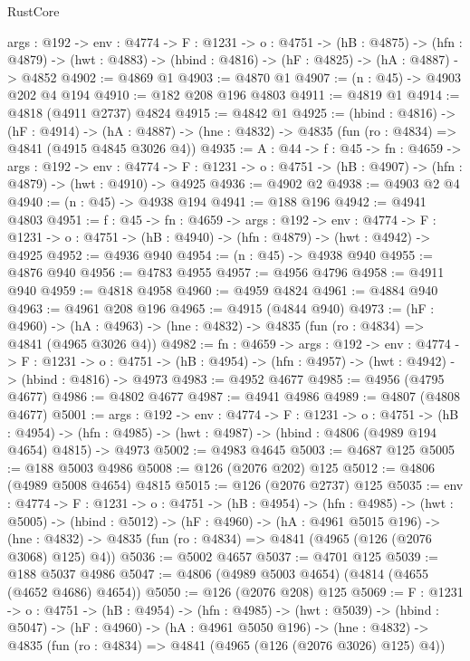 \begin{lexlean}{RustCore}
\begin{coremodule}
  {args : @192} ->
  {env : @4774} ->
  {F : @1231} ->
  {o : @4751} ->
  (hB : @4875) ->
  (hfn : @4879) -> (hwt : @4883) -> (hbind : @4816) -> (hF : @4825) -> (hA : @4887) -> @4852
@4902 := @4869 @1
@4903 := @4870 @1
@4907 := (n : @45) -> @4903 @202 @4 @194
@4910 := @182 @208 @196 @4803
@4911 := @4819 @1
@4914 := @4818 (@4911 @2737) @4824
@4915 := @4842 @1
@4925 := (hbind : @4816) ->
  (hF : @4914) ->
  (hA : @4887) -> (hne : @4832) -> @4835 (fun (ro : @4834) => @4841 (@4915 @4845 @3026 @4))
@4935 := {A : @44} ->
  {f : @45} ->
  {fn : @4659} ->
  {args : @192} ->
  {env : @4774} ->
  {F : @1231} -> {o : @4751} -> (hB : @4907) -> (hfn : @4879) -> (hwt : @4910) -> @4925
@4936 := @4902 @2
@4938 := @4903 @2 @4
@4940 := (n : @45) -> @4938 @194
@4941 := @188 @196
@4942 := @4941 @4803
@4951 := {f : @45} ->
  {fn : @4659} ->
  {args : @192} ->
  {env : @4774} ->
  {F : @1231} -> {o : @4751} -> (hB : @4940) -> (hfn : @4879) -> (hwt : @4942) -> @4925
@4952 := @4936 @940
@4954 := (n : @45) -> @4938 @940
@4955 := @4876 @940
@4956 := @4783 @4955
@4957 := @4956 @4796
@4958 := @4911 @940
@4959 := @4818 @4958
@4960 := @4959 @4824
@4961 := @4884 @940
@4963 := @4961 @208 @196
@4965 := @4915 (@4844 @940)
@4973 := (hF : @4960) ->
  (hA : @4963) -> (hne : @4832) -> @4835 (fun (ro : @4834) => @4841 (@4965 @3026 @4))
@4982 := {fn : @4659} ->
  {args : @192} ->
  {env : @4774} ->
  {F : @1231} ->
  {o : @4751} -> (hB : @4954) -> (hfn : @4957) -> (hwt : @4942) -> (hbind : @4816) -> @4973
@4983 := @4952 @4677
@4985 := @4956 (@4795 @4677)
@4986 := @4802 @4677
@4987 := @4941 @4986
@4989 := @4807 (@4808 @4677)
@5001 := {args : @192} ->
  {env : @4774} ->
  {F : @1231} ->
  {o : @4751} ->
  (hB : @4954) ->
  (hfn : @4985) -> (hwt : @4987) -> (hbind : @4806 (@4989 @194 @4654) @4815) -> @4973
@5002 := @4983 @4645
@5003 := @4687 @125
@5005 := @188 @5003 @4986
@5008 := @126 (@2076 @202) @125
@5012 := @4806 (@4989 @5008 @4654) @4815
@5015 := @126 (@2076 @2737) @125
@5035 := {env : @4774} ->
  {F : @1231} ->
  {o : @4751} ->
  (hB : @4954) ->
  (hfn : @4985) ->
  (hwt : @5005) ->
  (hbind : @5012) ->
  (hF : @4960) ->
  (hA : @4961 @5015 @196) ->
  (hne : @4832) -> @4835 (fun (ro : @4834) => @4841 (@4965 (@126 (@2076 @3068) @125) @4))
@5036 := @5002 @4657
@5037 := @4701 @125
@5039 := @188 @5037 @4986
@5047 := @4806 (@4989 @5003 @4654) (@4814 (@4655 (@4652 @4686) @4654))
@5050 := @126 (@2076 @208) @125
@5069 := {F : @1231} ->
  {o : @4751} ->
  (hB : @4954) ->
  (hfn : @4985) ->
  (hwt : @5039) ->
  (hbind : @5047) ->
  (hF : @4960) ->
  (hA : @4961 @5050 @196) ->
  (hne : @4832) -> @4835 (fun (ro : @4834) => @4841 (@4965 (@126 (@2076 @3026) @125) @4))

\end{coremodule}
\end{lexlean}
